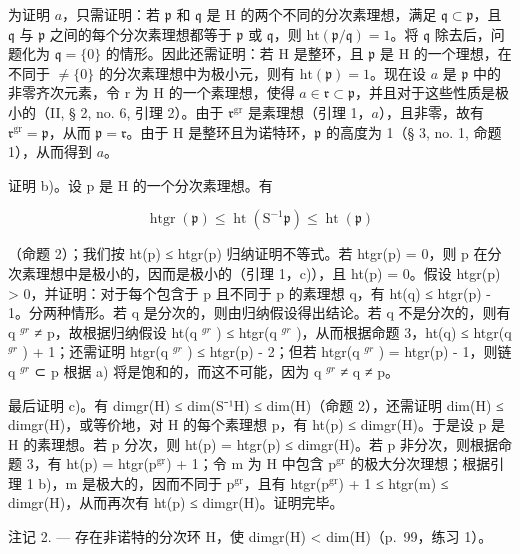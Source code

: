 为证明 \(a\)，只需证明：若 \(\mathfrak{p}\) 和 \(\mathfrak{q}\) 是 H 的两个不同的分次素理想，满足 \(\mathfrak{q} \subset \mathfrak{p}\)，且 \(\mathfrak{q}\) 与 \(\mathfrak{p}\) 之间的每个分次素理想都等于 \(\mathfrak{p}\) 或 \(\mathfrak{q}\)，则 \(\mathrm{ht}(\mathfrak{p}/\mathfrak{q}) = 1\)。将 \(\mathfrak{q}\) 除去后，问题化为 \(\mathfrak{q} = \{0\}\) 的情形。因此还需证明：若 H 是整环，且 \(\mathfrak{p}\) 是 H 的一个理想，在不同于 \(\neq \{0\}\) 的分次素理想中为极小元，则有 \(\mathrm{ht}(\mathfrak{p}) = 1\)。现在设 \(a\) 是 \(\mathfrak{p}\) 中的非零齐次元素，令 r 为 H 的一个素理想，使得 \(a \in \mathfrak{r} \subset \mathfrak{p}\)，并且对于这些性质是极小的（II, § 2, no. 6, 引理 2）。由于 \(\mathfrak{r}^{\mathrm{gr}}\) 是素理想（引理 1，\(a\)），且非零，故有 \(\mathfrak{r}^{\mathrm{gr}} = \mathfrak{p}\)，从而 \(\mathfrak{p} = \mathfrak{r}\)。由于 H 是整环且为诺特环，\(\mathfrak{p}\) 的高度为 1（§ 3, no. 1, 命题 1），从而得到 \(a\)。

证明 b)。设 p 是 H 的一个分次素理想。有

\[
\operatorname{htgr} (\mathfrak {p}) \leqslant \operatorname{ht} \left(\mathrm{S} ^ {- 1} \mathfrak {p}\right) \leqslant \operatorname{ht} (\mathfrak {p})
\]

（命题 2）；我们按 ht(p) ≤ htgr(p) 归纳证明不等式。若 htgr(p) = 0，则 p 在分次素理想中是极小的，因而是极小的（引理 1，c)），且 ht(p) = 0。假设 htgr(p) \textgreater{} 0，并证明：对于每个包含于 p 且不同于 p 的素理想 q，有 ht(q) ≤ htgr(p) - 1。分两种情形。若 q 是分次的，则由归纳假设得出结论。若 q 不是分次的，则有 q \(^{gr}\) ≠ p，故根据归纳假设 ht(q \(^{gr}\) ) ≤ htgr(q \(^{gr}\) )，从而根据命题 3，ht(q) ≤ htgr(q \(^{gr}\) ) + 1；还需证明 htgr(q \(^{gr}\) ) ≤ htgr(p) - 2；但若 htgr(q \(^{gr}\) ) = htgr(p) - 1，则链 q \(^{gr}\) ⊂ p 根据 a) 将是饱和的，而这不可能，因为 q \(^{gr}\) ≠ q ≠ p。

最后证明 c)。有 dimgr(H) ≤ dim(S⁻¹H) ≤ dim(H)（命题 2），还需证明 dim(H) ≤ dimgr(H)，或等价地，对 H 的每个素理想 p，有 ht(p) ≤ dimgr(H)。于是设 p 是 H 的素理想。若 p 分次，则 ht(p) = htgr(p) ≤ dimgr(H)。若 p 非分次，则根据命题 3，有 ht(p) = htgr(p\(^{\mathrm{gr}}\)) + 1；令 m 为 H 中包含 p\(^{\mathrm{gr}}\) 的极大分次理想；根据引理 1 b)，m 是极大的，因而不同于 p\(^{\mathrm{gr}}\)，且有 htgr(p\(^{\mathrm{gr}}\)) + 1 ≤ htgr(m) ≤ dimgr(H)，从而再次有 ht(p) ≤ dimgr(H)。证明完毕。

注记 2. --- 存在非诺特的分次环 H，使 dimgr(H) \textless{} dim(H)（p.~99，练习 1）。

